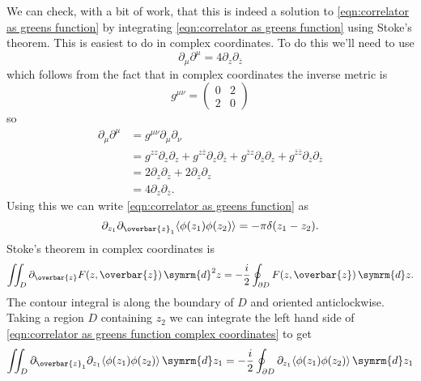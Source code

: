 \documentclass[fleqn]{NotesClass}
\renewcommand{\dd}[1]{\,\symrm{d}#1}
\DeclarePairedDelimiter{\correlator}{\langle}{\rangle}
\begin{document}
    We can check, with a bit of work, that this is indeed a solution to \cref{eqn:correlator as greens function} by integrating \cref{eqn:correlator as greens function} using Stoke's theorem.
    This is easiest to do in complex coordinates.
    To do this we'll need to use
    \begin{equation}
        \partial_\mu \partial^\mu = 4\partial_z \partial_{\overbar{z}}
    \end{equation}
    which follows from the fact that in complex coordinates the inverse metric is
    \begin{equation}
        g^{\mu\nu} = 
        \begin{pmatrix}
            0 & 2\\
            2 & 0
        \end{pmatrix}
    \end{equation}
    so
    \begin{align}
        \partial_\mu \partial^\mu &= g^{\mu\nu} \partial_\mu \partial_\nu\\
        &= g^{zz} \partial_z \partial_z + g^{z\overbar{z}} \partial_z \partial_{\overbar{z}} + g^{\overbar{z}z} \partial_{\overbar{z}} \partial_z + g^{\overbar{z}\overbar{z}} \partial_{\overbar{z}} \partial_{\overbar{z}}\\
        &= 2\partial_z \partial_{\overbar{z}} + 2\partial_{\overbar{z}} \partial_z\\
        &= 4\partial_z \partial_{\overbar{z}}.
    \end{align}
    Using this we can write \cref{eqn:correlator as greens function} as
    \begin{equation}
        \label{eqn:correlator as greens function complex coordinates}
        \partial_{z_1} \partial_{\overbar{z}_1} \correlator{\phi(z_1)\phi(z_2)} = -\pi\delta(z_1 - z_2).
    \end{equation}
    Stoke's theorem in complex coordinates is
    \begin{equation}
        \iint_D \partial_{\overbar{z}} F(z, \overbar{z}) \dd{^2z} = -\frac{i}{2} \oint_{\partial D} F(z, \overbar{z}) \dd{z}.
    \end{equation}
    The contour integral is along the boundary of \(D\) and oriented anticlockwise.
    Taking a region \(D\) containing \(z_2\) we can integrate the left hand side of \cref{eqn:correlator as greens function complex coordinates} to get
    \begin{equation}
        \iint_D \partial_{\overbar{z}_1} \partial_{z_1} \correlator{\phi(z_1)\phi(z_2)} \dd{z_1} = -\frac{i}{2}\oint_{\partial D} \partial_{z_1} \correlator{\phi(z_1)\phi(z_2)} \dd{z_1}
    \end{equation}
\end{document}
